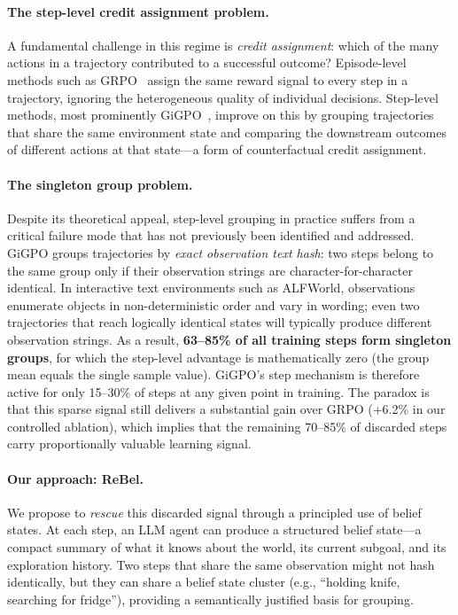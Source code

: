 \documentclass{article}
\begin{document}
\paragraph{The step-level credit assignment problem.}
A fundamental challenge in this regime is \emph{credit assignment}: which
of the many actions in a trajectory contributed to a successful outcome?
Episode-level methods such as GRPO~\citep{shao2024deepseekmath} assign the same
reward signal to every step in a trajectory, ignoring the heterogeneous quality
of individual decisions.
Step-level methods, most prominently GiGPO~\citep{feng2025gigpo}, improve on
this by grouping trajectories that share the same environment state and comparing
the downstream outcomes of different actions at that state---a form of
counterfactual credit assignment.

\paragraph{The singleton group problem.}
Despite its theoretical appeal, step-level grouping in practice suffers from
a critical failure mode that has not previously been identified and addressed.
GiGPO groups trajectories by \emph{exact observation text hash}: two steps
belong to the same group only if their observation strings are character-for-character
identical.
In interactive text environments such as ALFWorld, observations enumerate objects
in non-deterministic order and vary in wording; even two trajectories that reach
logically identical states will typically produce different observation strings.
As a result, \textbf{63--85\% of all training steps form singleton groups},
for which the step-level advantage is mathematically zero (the group mean equals
the single sample value).
GiGPO's step mechanism is therefore active for only 15--30\% of steps
at any given point in training.
The paradox is that this sparse signal still delivers a substantial gain over
GRPO (+6.2\% in our controlled ablation), which implies that the remaining
70--85\% of discarded steps carry proportionally valuable learning signal.

\paragraph{Our approach: ReBel.}
We propose to \emph{rescue} this discarded signal through a principled use of
belief states.
At each step, an LLM agent can produce a structured belief state---a compact
summary of what it knows about the world, its current subgoal, and its
exploration history.
Two steps that share the same observation might not hash identically, but they
can share a belief state cluster (e.g., ``holding knife, searching for fridge''),
providing a semantically justified basis for grouping.
\end{document}
